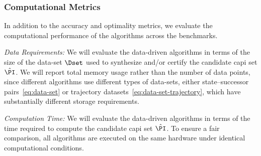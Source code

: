 \subsubsection{Computational Metrics}

In addition to the accuracy and optimality metrics, we evaluate the computational performance of the algorithms across the benchmarks.

\emph{Data Requirements:} 
We will evaluate the data-driven algorithms in terms of the size of the data-set $\Dset$ used to synthesize and/or certify the candidate \ac{capi} set $\hat{\PI}$. 
We will report total memory usage rather than the number of data points, since different algorithms use different types of data-sets, either state–successor pairs~\eqref{eq:data-set} or trajectory datasets~\eqref{eq:data-set-trajectory}, which have substantially different storage requirements.

\emph{Computation Time:} 
We will evaluate the data-driven algorithms in terms of the time required to compute the candidate \ac{capi} set $\hat{\PI}$. 
To ensure a fair comparison, all algorithms are executed on the same hardware under identical computational conditions.